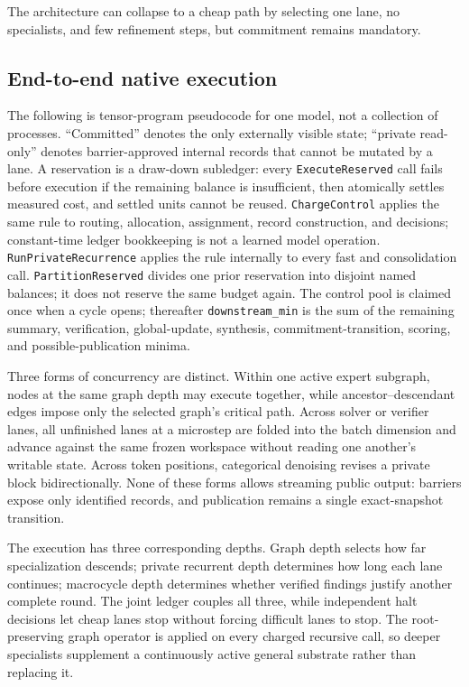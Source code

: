 \documentclass[10pt,a4paper]{article}
\begin{document}
The architecture can collapse to a cheap path by selecting one lane, no
specialists, and few refinement steps, but commitment remains mandatory.

\subsection{End-to-end native execution}

The following is tensor-program pseudocode for one model, not a collection of
processes. ``Committed'' denotes the only externally visible state; ``private
read-only'' denotes barrier-approved internal records that cannot be mutated
by a lane. A reservation is a draw-down subledger: every
\texttt{ExecuteReserved} call fails before execution if the remaining balance
is insufficient, then atomically settles measured cost, and settled units
cannot be reused. \texttt{ChargeControl} applies the same rule to routing,
allocation, assignment, record construction, and decisions; constant-time
ledger bookkeeping is not a learned model operation.
\texttt{RunPrivateRecurrence} applies the rule internally to every fast and
consolidation call. \texttt{PartitionReserved} divides one prior reservation
into disjoint named balances; it does not reserve the same budget again. The
control pool is claimed once when a cycle opens; thereafter
\texttt{downstream\_min} is the sum of the remaining summary, verification,
global-update, synthesis, commitment-transition, scoring, and
possible-publication minima.

Three forms of concurrency are distinct. Within one active expert subgraph,
nodes at the same graph depth may execute together, while
ancestor--descendant edges impose only the selected graph's critical path.
Across solver or verifier lanes, all unfinished lanes at a microstep are
folded into the batch dimension and advance against the same frozen workspace
without reading one another's writable state. Across token positions,
categorical denoising revises a private block bidirectionally. None of these
forms allows streaming public output: barriers expose only identified
records, and publication remains a single exact-snapshot transition.

The execution has three corresponding depths. Graph depth selects how far
specialization descends; private recurrent depth determines how long each lane
continues; macrocycle depth determines whether verified findings justify
another complete round. The joint ledger couples all three, while independent
halt decisions let cheap lanes stop without forcing difficult lanes to stop.
The root-preserving graph operator is applied on every charged recursive
call, so deeper specialists supplement a continuously active general
substrate rather than replacing it.
\end{document}
